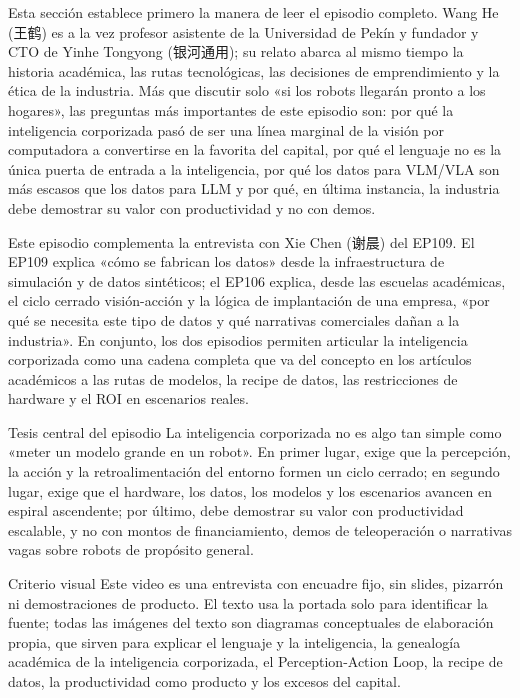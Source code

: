 \documentclass[a4paper]{article}
\begin{document}
Esta sección establece primero la manera de leer el episodio completo. Wang He (王鹤) es a la vez profesor asistente de la Universidad de Pekín y fundador y CTO de Yinhe Tongyong (银河通用); su relato abarca al mismo tiempo la historia académica, las rutas tecnológicas, las decisiones de emprendimiento y la ética de la industria. Más que discutir solo «si los robots llegarán pronto a los hogares», las preguntas más importantes de este episodio son: por qué la inteligencia corporizada pasó de ser una línea marginal de la visión por computadora a convertirse en la favorita del capital, por qué el lenguaje no es la única puerta de entrada a la inteligencia, por qué los datos para VLM/VLA son más escasos que los datos para LLM y por qué, en última instancia, la industria debe demostrar su valor con productividad y no con demos.

Este episodio complementa la entrevista con Xie Chen (谢晨) del EP109. El EP109 explica «cómo se fabrican los datos» desde la infraestructura de simulación y de datos sintéticos; el EP106 explica, desde las escuelas académicas, el ciclo cerrado visión-acción y la lógica de implantación de una empresa, «por qué se necesita este tipo de datos y qué narrativas comerciales dañan a la industria». En conjunto, los dos episodios permiten articular la inteligencia corporizada como una cadena completa que va del concepto en los artículos académicos a las rutas de modelos, la recipe de datos, las restricciones de hardware y el ROI en escenarios reales.

\begin{importantbox}{Tesis central del episodio}
La inteligencia corporizada no es algo tan simple como «meter un modelo grande en un robot». En primer lugar, exige que la percepción, la acción y la retroalimentación del entorno formen un ciclo cerrado; en segundo lugar, exige que el hardware, los datos, los modelos y los escenarios avancen en espiral ascendente; por último, debe demostrar su valor con productividad escalable, y no con montos de financiamiento, demos de teleoperación o narrativas vagas sobre robots de propósito general.
\end{importantbox}

\begin{knowledgebox}{Criterio visual}
Este video es una entrevista con encuadre fijo, sin slides, pizarrón ni demostraciones de producto. El texto usa la portada solo para identificar la fuente; todas las imágenes del texto son diagramas conceptuales de elaboración propia, que sirven para explicar el lenguaje y la inteligencia, la genealogía académica de la inteligencia corporizada, el Perception-Action Loop, la recipe de datos, la productividad como producto y los excesos del capital.
\end{knowledgebox}
\end{document}

